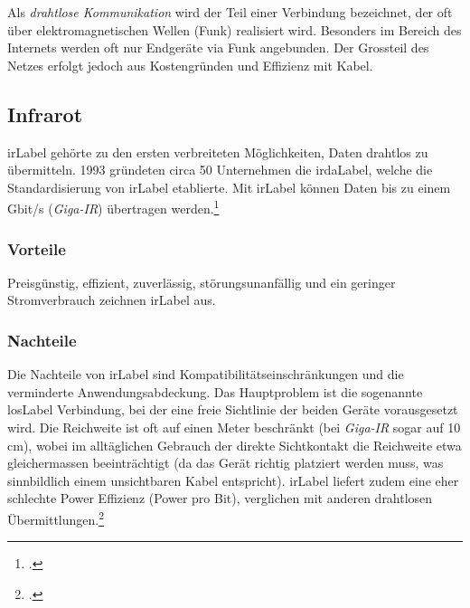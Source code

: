 Als \textit{drahtlose Kommunikation} wird der Teil einer Verbindung bezeichnet, der oft über elektromagnetischen Wellen (Funk) realisiert wird.
Besonders im Bereich des Internets werden oft nur Endgeräte via Funk angebunden.
Der Grossteil des Netzes erfolgt jedoch aus Kostengründen und Effizienz mit Kabel.




\subsection{Infrarot}
\gls{irLabel} gehörte zu den ersten verbreiteten Möglichkeiten, Daten drahtlos zu übermitteln.
1993 gründeten circa 50 Unternehmen die \gls{irdaLabel}, welche die Standardisierung von \gls{irLabel} etablierte.
Mit \gls{irLabel} können Daten bis zu einem Gbit/s (\textit{Giga-IR}) übertragen werden.\footcite{Infrared_Data_Association_Wikipedia_2015-05-22}

\subsubsection{Vorteile}
Preisgünstig, effizient, zuverlässig, störungsunanfällig und ein geringer Stromverbrauch zeichnen \gls{irLabel} aus.

\subsubsection{Nachteile}
Die Nachteile von \gls{irLabel} sind Kompatibilitätseinschränkungen und die verminderte Anwendungsabdeckung.
Das Hauptproblem ist die sogenannte \gls{losLabel} Verbindung, bei der eine freie Sichtlinie der beiden Geräte vorausgesetzt wird.
Die Reichweite ist oft auf einen Meter beschränkt (bei \textit{Giga-IR} sogar auf 10\,cm), wobei im alltäglichen Gebrauch der direkte Sichtkontakt die Reichweite etwa gleichermassen beeinträchtigt (da das Gerät richtig platziert werden muss, was sinnbildlich einem unsichtbaren Kabel entspricht).
\gls{irLabel} liefert zudem eine eher schlechte Power Effizienz (Power pro Bit), verglichen mit anderen drahtlosen Übermittlungen.\footcite{Comparing_Low_Power_Wireless_Technologies_DigiKey_2015-05-22}


